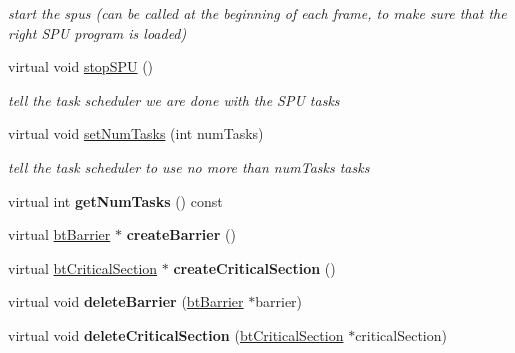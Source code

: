 \begin{DoxyCompactItemize}
\begin{DoxyCompactList}\small\item\em start the spus (can be called at the beginning of each frame, to make sure that the right S\+P\+U program is loaded) \end{DoxyCompactList}\item 
\hypertarget{class_sequential_thread_support_a306f9453238a2c97c0722be98d836e5b}{virtual void \hyperlink{class_sequential_thread_support_a306f9453238a2c97c0722be98d836e5b}{stop\+S\+P\+U} ()}\label{class_sequential_thread_support_a306f9453238a2c97c0722be98d836e5b}

\begin{DoxyCompactList}\small\item\em tell the task scheduler we are done with the S\+P\+U tasks \end{DoxyCompactList}\item 
\hypertarget{class_sequential_thread_support_a9981028afebe39bdb99c1b224487ecb2}{virtual void \hyperlink{class_sequential_thread_support_a9981028afebe39bdb99c1b224487ecb2}{set\+Num\+Tasks} (int num\+Tasks)}\label{class_sequential_thread_support_a9981028afebe39bdb99c1b224487ecb2}

\begin{DoxyCompactList}\small\item\em tell the task scheduler to use no more than num\+Tasks tasks \end{DoxyCompactList}\item 
\hypertarget{class_sequential_thread_support_ad73cc6ee72095a810b3cdd445b4f4306}{virtual int {\bfseries get\+Num\+Tasks} () const }\label{class_sequential_thread_support_ad73cc6ee72095a810b3cdd445b4f4306}

\item 
\hypertarget{class_sequential_thread_support_a1ec0395df2739569d98f9828b62980f3}{virtual \hyperlink{classbt_barrier}{bt\+Barrier} $\ast$ {\bfseries create\+Barrier} ()}\label{class_sequential_thread_support_a1ec0395df2739569d98f9828b62980f3}

\item 
\hypertarget{class_sequential_thread_support_ab4ac7fe50f11250c1f0e9dc2fa81ca52}{virtual \hyperlink{classbt_critical_section}{bt\+Critical\+Section} $\ast$ {\bfseries create\+Critical\+Section} ()}\label{class_sequential_thread_support_ab4ac7fe50f11250c1f0e9dc2fa81ca52}

\item 
\hypertarget{class_sequential_thread_support_a745672b1af3b6df4ae91762767dda3f0}{virtual void {\bfseries delete\+Barrier} (\hyperlink{classbt_barrier}{bt\+Barrier} $\ast$barrier)}\label{class_sequential_thread_support_a745672b1af3b6df4ae91762767dda3f0}

\item 
\hypertarget{class_sequential_thread_support_a0f50cbff72ad439a1d5377a062c03b71}{virtual void {\bfseries delete\+Critical\+Section} (\hyperlink{classbt_critical_section}{bt\+Critical\+Section} $\ast$critical\+Section)}\label{class_sequential_thread_support_a0f50cbff72ad439a1d5377a062c03b71}

\end{DoxyCompactItemize}


